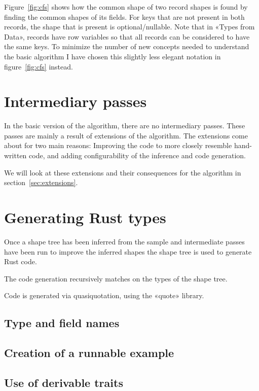 Figure~\ref{fig:cfs} shows how the common shape of two record shapes is found by finding the common shapes of its fields. For keys that are not present in both records, the shape that is present is optional/nullable. Note that in «Types from Data», records have row variables\cite{row-types} so that all records can be considered to have the same keys. To minimize the number of new concepts needed to understand the basic algorithm I have chosen this slightly less elegant notation in figure~\ref{fig:cfs} instead.

\section{Intermediary passes}

In the basic version of the algorithm, there are no intermediary passes. These passes are mainly a result of extensions of the algorithm. The extensions come about for two main reasons: Improving the code to more closely resemble hand-written code, and adding configurability of the inference and code generation.

We will look at these extensions and their consequences for the algorithm in section~\ref{sec:extensions}.

\section{Generating Rust types}

Once a shape tree has been inferred from the sample and intermediate passes have been run to improve the inferred shapes the shape tree is used to generate Rust code.

The code generation recursively matches on the types of the shape tree.

Code is generated via quasiquotation, using the «quote» library.

\subsection{Type and field names}


\subsection{Creation of a runnable example}


\subsection{Use of derivable traits}
\label{sec:use-of-derivable-traits}

